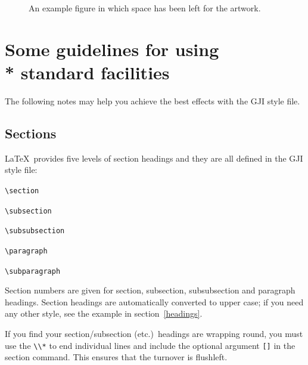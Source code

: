 \documentclass{gji}
\begin{document}
 \begin{figure}
     \vspace{5.5cm}
     \caption{An example figure in which space has been
              left for the artwork.}
     \label{sample-figure}
  \end{figure}

\section[]{Some guidelines for using\\* standard facilities}

The following notes may help you achieve the best effects with the GJI
style file.

\subsection{Sections}

\LaTeX\ provides five levels of section headings and they are all
defined in the GJI style file:
\begin{description}
  \item \verb"\section"
  \item \verb"\subsection"
  \item \verb"\subsubsection"
  \item \verb"\paragraph"
  \item \verb"\subparagraph"
\end{description}
Section numbers are given for section, subsection, subsubsection
and paragraph headings.  Section headings are automatically converted to
upper case; if you need any other style, see the example in section~\ref{headings}.

If you find your section/subsection (etc.)\ headings are wrapping round,
you must use the \verb"\\*" to end individual lines and include the
optional argument \verb"[]" in the section command. This ensures that
the turnover is flushleft.
\end{document}
